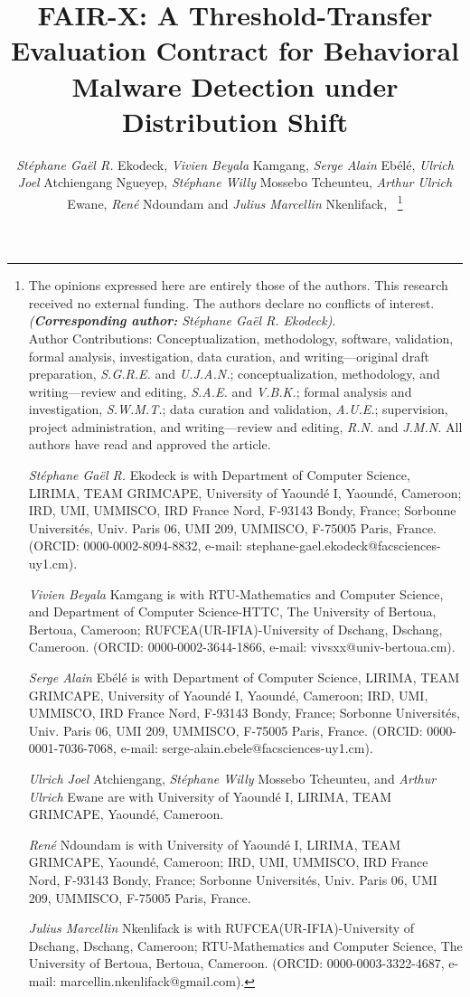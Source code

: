 \documentclass[10pt,journal,compsoc]{IEEEtran}
\begin{document}
\title{FAIR-X: A Threshold-Transfer Evaluation Contract for Behavioral Malware Detection under Distribution Shift}

\author{\emph{St\'{e}phane Ga\"{e}l R.} Ekodeck, \emph{Vivien Beyala} Kamgang, \emph{Serge Alain} Eb\'{e}l\'{e}, \emph{Ulrich Joel} Atchiengang Ngueyep,  \emph{St\'{e}phane Willy} Mossebo Tcheunteu,  \emph{Arthur Ulrich} Ewane, \emph{Ren\'{e}} Ndoundam and \emph{Julius Marcellin} Nkenlifack,~
\thanks{The opinions expressed here are entirely those of the authors. This research received no external funding. The authors declare no conflicts of interest. \emph{(\textbf{Corresponding author:} St\'{e}phane Ga\"{e}l R. Ekodeck)}. \\
Author Contributions: Conceptualization, methodology, software, validation, formal analysis, investigation, data curation, and writing---original draft preparation, \emph{S.G.R.E.} and \emph{U.J.A.N.}; conceptualization, methodology, and writing---review and editing, \emph{S.A.E.} and \emph{V.B.K.}; formal analysis and investigation, \emph{S.W.M.T.}; data curation and validation, \emph{A.U.E.}; supervision, project administration, and writing---review and editing, \emph{R.N.} and \emph{J.M.N.} All authors have read and approved the article.
\par \emph{St\'{e}phane Ga\"{e}l R.} Ekodeck is with Department of Computer Science, LIRIMA, TEAM GRIMCAPE, University of Yaound\'{e} I, Yaound\'{e}, Cameroon; IRD, UMI, UMMISCO, IRD France Nord, F-93143 Bondy, France; Sorbonne Universit\'{e}s, Univ. Paris 06, UMI 209, UMMISCO, F-75005 Paris, France. (ORCID: 0000-0002-8094-8832, e-mail: stephane-gael.ekodeck@facsciences-uy1.cm).
\par \emph{Vivien Beyala} Kamgang is with RTU-Mathematics and Computer Science, and Department of Computer Science-HTTC, The University of Bertoua, Bertoua, Cameroon; RUFCEA(UR-IFIA)-University of Dschang, Dschang, Cameroon. (ORCID: 0000-0002-3644-1866, e-mail: vivsxx@univ-bertoua.cm).
\par \emph{Serge Alain} Eb\'{e}l\'{e} is with Department of Computer Science, LIRIMA, TEAM GRIMCAPE, University of Yaound\'{e} I, Yaound\'{e}, Cameroon; IRD, UMI, UMMISCO, IRD France Nord, F-93143 Bondy, France; Sorbonne Universit\'{e}s, Univ. Paris 06, UMI 209, UMMISCO, F-75005 Paris, France. (ORCID: 0000-0001-7036-7068, e-mail: serge-alain.ebele@facsciences-uy1.cm).
\par \emph{Ulrich Joel} Atchiengang, \emph{St\'{e}phane Willy} Mossebo Tcheunteu, and \emph{Arthur Ulrich} Ewane are with University of Yaound\'{e} I, LIRIMA, TEAM GRIMCAPE, Yaound\'{e}, Cameroon.
\par \emph{Ren\'{e}} Ndoundam is with University of Yaound\'{e} I, LIRIMA, TEAM GRIMCAPE, Yaound\'{e}, Cameroon; IRD, UMI, UMMISCO, IRD France Nord, F-93143 Bondy, France; Sorbonne Universit\'{e}s, Univ. Paris 06, UMI 209, UMMISCO, F-75005 Paris, France.
\par \emph{Julius Marcellin} Nkenlifack is with RUFCEA(UR-IFIA)-University of Dschang, Dschang, Cameroon; RTU-Mathematics and Computer Science, The University of Bertoua, Bertoua, Cameroon. (ORCID: 0000-0003-3322-4687, e-mail: marcellin.nkenlifack@gmail.com).}}
\end{document}
